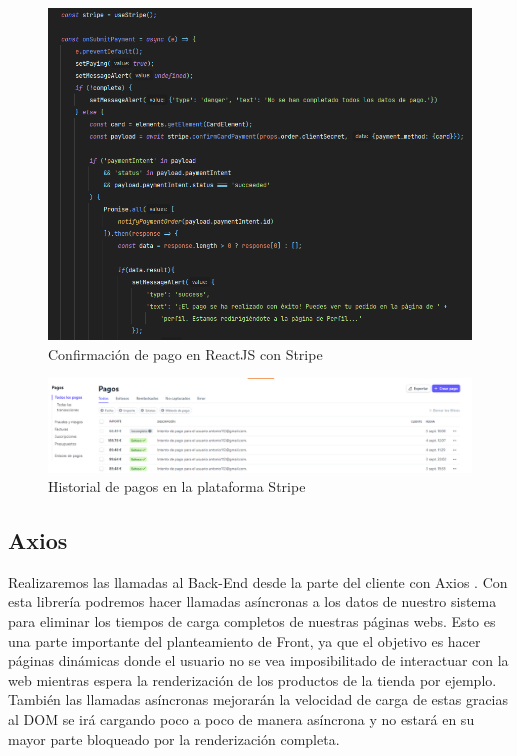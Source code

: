 \begin{figure}[H]
  \centering
  \includegraphics[scale=0.5]{images/front-end-stripe.png}
  \caption{Confirmación de pago en ReactJS con Stripe}
  \label{}
\end{figure}

\begin{figure}[H]
  \centering
  \includegraphics[scale=0.25]{images/back-end-stripe.png}
  \caption{Historial de pagos en la plataforma Stripe}
  \label{}
\end{figure}

\subsection{Axios} 

Realizaremos las llamadas al Back-End desde la parte del cliente con Axios \cite{axios}. Con esta librería podremos hacer llamadas asíncronas a los datos de nuestro sistema para eliminar los tiempos de carga completos de nuestras páginas webs. Esto es una parte importante del planteamiento de Front, ya que el objetivo es hacer páginas dinámicas donde el usuario no se vea imposibilitado de interactuar con la web mientras espera la renderización de los productos de la tienda por ejemplo. También las llamadas asíncronas mejorarán la velocidad de carga de estas gracias al DOM se irá cargando poco a poco de manera asíncrona y no estará en su mayor parte bloqueado por la renderización completa. 

